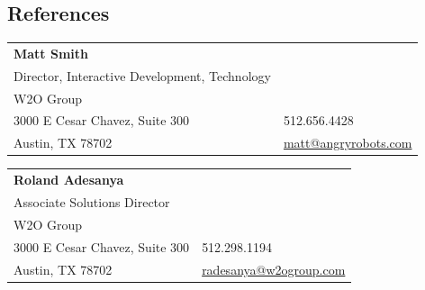 \documentclass[margin,line]{resume}
\begin{document}
\begin{resume}



\section{\mysidestyle References}

\begin{tabular}{@{}p{9cm}p{3cm}}
\textbf{Matt Smith}\\
Director, Interactive Development, Technology\\
W2O Group\\
3000 E Cesar Chavez, Suite 300                 &  512.656.4428\\
Austin, TX 78702                     &  \href{mailto:matt@angryrobots.com}{matt@angryrobots.com}\\
\end{tabular}

\begin{tabular}{@{}p{9cm}p{3cm}}
\textbf{Roland Adesanya}\\
Associate Solutions Director\\
W2O Group\\
3000 E Cesar Chavez, Suite 300                 &  512.298.1194\\
Austin, TX 78702                     &  \href{mailto:radesanya@w2ogroup.com}{radesanya@w2ogroup.com}\\
\end{tabular}



\end{resume}
\end{document}
